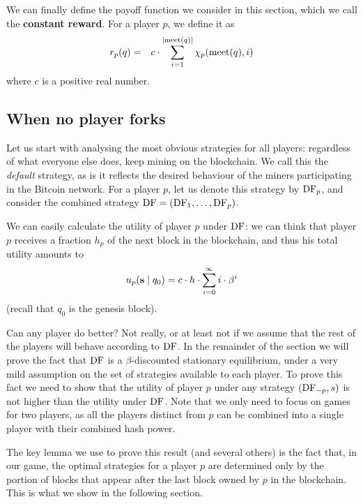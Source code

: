 We can finally define the payoff function we consider in this section, which we call the \textbf{constant reward}. For a player $p$, we define it as 
\begin{eqnarray*}
r_p(q) & = & 
{\displaystyle c \cdot \sum_{i=1}^{|\text{\rm meet}(q)|} \chi_p(\text{\rm meet}(q),i)} 
\end{eqnarray*}
where $c$ is a positive real number. 
 
\subsection{When no player forks}

Let us start with analysing the most obvious strategies for all players: regardless of what everyone else does, keep mining on the blockchain. We call this 
the \emph{default} strategy, as is it reflects the desired behaviour of the miners participating in the Bitcoin network. For a player $p$, let us denote this strategy 
by $\text{\rm DF}_p$, and consider the combined strategy $\text{\rm DF} = (\text{\rm DF}_1,\dots,\text{\rm DF}_p)$. 

We can easily calculate the utility of player $p$ under $\text{\rm DF}$: we can think that player $p$ receives a fraction $h_p$ of the next block in the blockchain, and thus his 
total utility amounts to $$u_p(\mathbf{s} \mid q_0) = c\cdot h \cdot \sum_{i=0}^{\infty}i \cdot \beta^{i}$$ (recall that $q_0$ is the genesis block). 

Can any player do better? Not really, or at least not if we assume that the rest of the players will behave according to $\text{\rm DF}$. In the remainder of the section we 
will prove the fact that $\text{\rm DF}$ is a $\beta$-discounted stationary equilibrium, under a very mild assumption on the set of strategies available to each player. 
To prove this fact we need to show that the utility of player $p$ under any strategy $(\text{\rm DF}_{-p},s)$ is not higher than the utility under $\text{\rm DF}$. Note that we only need to focus on 
games for two players, as all the players distinct from $p$ can be combined into a single player with their combined hash power. 

The key lemma we use to prove this result (and several others) is the fact that, in our game, the optimal strategies for a player $p$ are determined only by the portion 
of blocks that appear after the last block owned by $p$ in the blockchain. This is what we show in the following section. 

